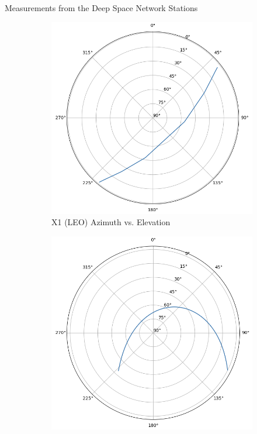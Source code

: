 \begin{hwkProblem}{4}{Measurements from the Deep Space Network Stations}
	\begin{figure}[H] \label{fig:s04a}
		\begin{center}
			\begin{subfigure}{0.4\textwidth} \label{fig:s04a1}
				\includegraphics[width=\linewidth]{./outputs/figures/s04a1.png}
				\caption{X1 (LEO) Azimuth vs. Elevation}
			\end{subfigure}
			\begin{subfigure}{0.4\textwidth} \label{fig:s04a2}
				\includegraphics[width=\linewidth]{./outputs/figures/s04a2.png}

\end{subfigure}
\end{center}
\end{figure}
\end{hwkProblem}
